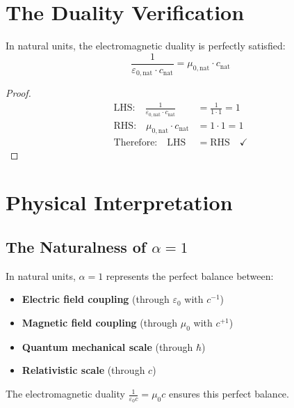 	\section{The Duality Verification}
	
	\begin{theorem}
		In natural units, the electromagnetic duality is perfectly satisfied:
		\begin{equation}
			\frac{1}{\varepsilon_{0,\text{nat}} \cdot c_{\text{nat}}} = \mu_{0,\text{nat}} \cdot c_{\text{nat}}
		\end{equation}
	\end{theorem}
	
	\begin{proof}
		\begin{align}
			\text{LHS:} \quad \frac{1}{\varepsilon_{0,\text{nat}} \cdot c_{\text{nat}}} &= \frac{1}{1 \cdot 1} = 1\\
			\text{RHS:} \quad \mu_{0,\text{nat}} \cdot c_{\text{nat}} &= 1 \cdot 1 = 1\\
			\text{Therefore:} \quad \text{LHS} &= \text{RHS} \quad \checkmark
		\end{align}
	\end{proof}
	
	\section{Physical Interpretation}
	
	\subsection{The Naturalness of $\alpha = 1$}
	
	\begin{tcolorbox}[colback=green!5!white,colframe=green!75!black,title=Key Physical Insight]
		In natural units, $\alpha = 1$ represents the perfect balance between:
		\begin{itemize}
			\item \textbf{Electric field coupling} (through $\varepsilon_0$ with $c^{-1}$)
			\item \textbf{Magnetic field coupling} (through $\mu_0$ with $c^{+1}$)
			\item \textbf{Quantum mechanical scale} (through $\hbar$)
			\item \textbf{Relativistic scale} (through $c$)
		\end{itemize}
		
		The electromagnetic duality $\frac{1}{\varepsilon_0 c} = \mu_0 c$ ensures this perfect balance.
	\end{tcolorbox}
	
